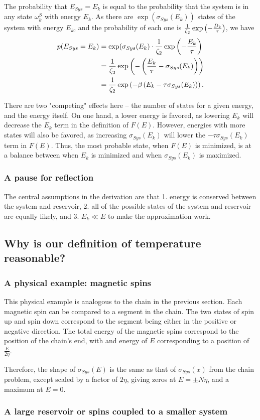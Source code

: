 \documentclass{paper}
\begin{document}
\par The probability that $E_{Sys} = E_k$ is equal to the probability that the system is in any state $\omega^S_k$ with energy $E_k$.  As there are $\exp(\sigma_{Sys}(E_k))$ states of the system with energy $E_k$, and the probability of each one is $\frac{1}{\zeta_2}\exp\left(-\frac{D_k}{\tau}\right)$, we have
    \begin{align*}
        p(E_{Sys} = E_k) 
        &= \exp(\sigma_{Sys}(E_k) \cdot \frac{1}{\zeta_2} \exp \left( - \frac{E_k}{\tau} \right) \\
        &= \frac{1}{\zeta_2} \exp \left( - \left( \frac{E_k}{\tau} - \sigma_{Sys}(E_k) \right) \right) \\
        &= \frac{1}{\zeta_2} \exp \left( -\beta \left( E_k - \tau \sigma_{Sys}(E_k) \right) \right).
    \end{align*}
    
\par There are two "competing" effects here -- the number of states for a given energy, and the energy itself.  On one hand, a lower energy is favored, as lowering $E_k$ will decrease the $E_k$ term in the definition of $F(E)$.  However, energies with more states will also be favored, as increasing $\sigma_{Sys}(E_k)$ will lower the $-\tau \sigma_{Sys}(E_k)$ term in $F(E)$.  Thus, the most probable state, when $F(E)$ is minimized, is at a balance between when $E_k$ is minimized and when $\sigma_{Sys}(E_k)$ is maximized.
    
\subsubsection{A pause for reflection}

\par The central assumptions in the derivation are that 1. energy is conserved between the system and reservoir, 2. all of the possible states of the system and reservoir are equally likely, and 3. $E_k \ll E$ to make the approximation work.

\subsection{Why is our definition of temperature reasonable?}
\subsubsection{A physical example: magnetic spins}

\par This physical example is analogous to the chain in the previous section.  Each magnetic spin can be compared to a segment in the chain.  The two states of spin up and spin down correspond to the segment being either in the positive or negative direction.  The total energy of the magnetic spins correspond to the position of the chain's end, with and energy of $E$ corresponding to a position of $\frac{E}{2\eta}$.  

\par Therefore, the shape of $\sigma_{Sys}(E)$ is the same as that of $\sigma_{Sys}(x)$ from the chain problem, except scaled by a factor of $2\eta$, giving zeros at $E = \pm N\eta$, and a maximum at $E=0$.

\subsubsection{A large reservoir or spins coupled to a smaller system}

\par 
\end{document}
